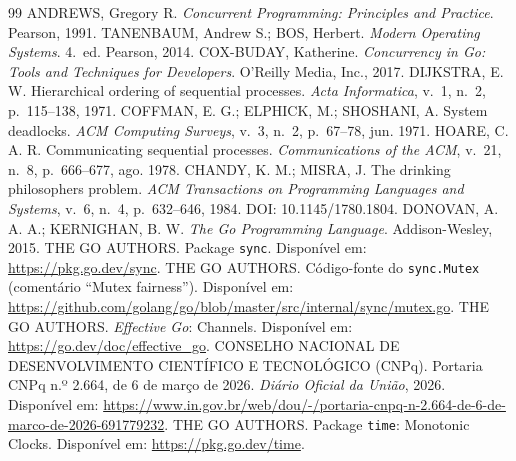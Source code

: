 \documentclass[11pt,a4paper]{article}
\begin{document}
\renewcommand{\refname}{Referências}
\begin{thebibliography}{99}\sloppy
\small
{} ANDREWS, Gregory R. \textit{Concurrent Programming: Principles and Practice}.
  Pearson, 1991.
 TANENBAUM, Andrew S.; BOS, Herbert. \textit{Modern Operating Systems}. 4.~ed.
  Pearson, 2014.
 COX-BUDAY, Katherine. \textit{Concurrency in Go: Tools and Techniques for
  Developers}. O'Reilly Media, Inc., 2017.
 DIJKSTRA, E. W. Hierarchical ordering of sequential processes.
  \textit{Acta Informatica}, v.~1, n.~2, p.~115--138, 1971. 
 COFFMAN, E. G.; ELPHICK, M.; SHOSHANI, A. System deadlocks.
  \textit{ACM Computing Surveys}, v.~3, n.~2, p.~67--78, jun. 1971.
 HOARE, C. A. R. Communicating sequential processes.
  \textit{Communications of the ACM}, v.~21, n.~8, p.~666--677, ago. 1978.
 CHANDY, K. M.; MISRA, J. The drinking philosophers problem.
  \textit{ACM Transactions on Programming Languages and Systems}, v.~6, n.~4, p.~632--646, 1984.
  DOI: 10.1145/1780.1804.
 DONOVAN, A. A. A.; KERNIGHAN, B. W. \textit{The Go Programming Language}.
  Addison-Wesley, 2015.
 THE GO AUTHORS. Package \texttt{sync}. Disponível em: \url{https://pkg.go.dev/sync}.
 THE GO AUTHORS. Código-fonte do \texttt{sync.Mutex} (comentário ``Mutex fairness'').
  Disponível em: \url{https://github.com/golang/go/blob/master/src/internal/sync/mutex.go}.
 THE GO AUTHORS. \textit{Effective Go}: Channels. Disponível em:
  \url{https://go.dev/doc/effective_go}.
 CONSELHO NACIONAL DE DESENVOLVIMENTO CIENTÍFICO E TECNOLÓGICO (CNPq).
  Portaria CNPq n.º 2.664, de 6 de março de 2026. \textit{Diário Oficial da União}, 2026. Disponível em:
  \url{https://www.in.gov.br/web/dou/-/portaria-cnpq-n-2.664-de-6-de-marco-de-2026-691779232}.
 THE GO AUTHORS. Package \texttt{time}: Monotonic Clocks. Disponível em:
  \url{https://pkg.go.dev/time}.
\end{thebibliography}
\end{document}
